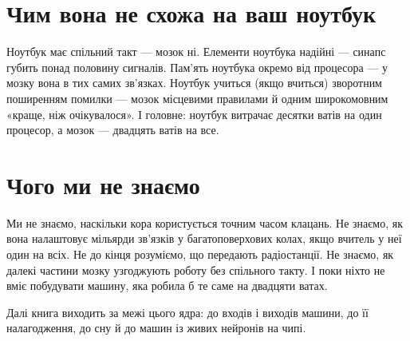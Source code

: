 \section*{Чим вона не схожа на ваш ноутбук}

Ноутбук має спільний такт --- мозок ні. Елементи ноутбука надійні --- синапс губить понад половину сигналів. Пам'ять ноутбука окремо від процесора --- у мозку вона в тих самих зв'язках. Ноутбук учиться (якщо вчиться) зворотним поширенням помилки --- мозок місцевими правилами й одним широкомовним «краще, ніж очікувалося». І головне: ноутбук витрачає десятки ватів на один процесор, а мозок --- двадцять ватів на все.

\section*{Чого ми не знаємо}

Ми не знаємо, наскільки кора користується точним часом клацань. Не знаємо, як вона налаштовує мільярди зв'язків у багатоповерхових колах, якщо вчитель у неї один на всіх. Не до кінця розуміємо, що передають радіостанції. Не знаємо, як далекі частини мозку узгоджують роботу без спільного такту. І поки ніхто не вміє побудувати машину, яка робила б те саме на двадцяти ватах.

Далі книга виходить за межі цього ядра: до входів і виходів машини, до її налагодження, до сну й до машин із живих нейронів на чипі.

